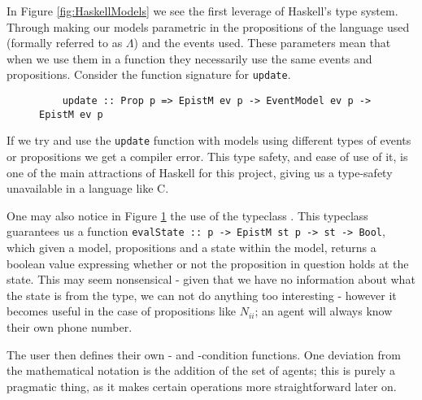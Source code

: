 \documentclass[10pt, a4paper]{report}
\begin{document}
In Figure \ref{fig:HaskellModels} we see the first leverage of Haskell's type
system. Through making our models parametric in the propositions of the language
used (formally referred to as $\Lambda$) and the events used. These parameters
mean that when we use them in a function they necessarily use the same events
and propositions. Consider the function signature for \texttt{update}.

\begin{figure}[h]
  \centering
  \begin{verbatim}
    update :: Prop p => EpistM ev p -> EventModel ev p -> EpistM ev p
\end{verbatim}
  \caption{}
  \label{fig:UpdateType}
\end{figure}

If we try and use the \texttt{update} function with models using
different types of events or propositions we get a compiler error. This type
safety, and ease of use of it, is one of the main attractions of Haskell for
this project, giving us a type-safety unavailable in a language like C.

One may also notice in Figure \ref{fig:UpdateType} the use of the typeclass
. This typeclass guarantees us a function
\texttt{evalState :: p -> EpistM st p -> st -> Bool}, which given a
model, propositions and a state within the model, returns a boolean value
expressing whether or not the proposition in question holds at the state. This may
seem nonsensical - given that we have no information about what the state is
from the type, we can not do anything too interesting - however it becomes
useful in the case of propositions like $N_{ii}$; an agent will always know
their own phone number. 

The user then defines their own \tpre- and \tpost-condition functions. One
deviation from the mathematical notation is the addition of the set of agents;
this is purely a pragmatic thing, as it makes certain operations more
straightforward later on.
\end{document}
